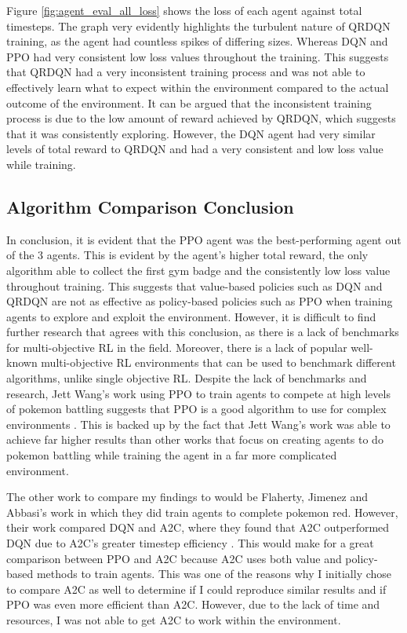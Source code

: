Figure \ref{fig:agent_eval_all_loss} shows the loss of each agent against total timesteps. The graph very evidently highlights the turbulent nature of QRDQN training, as the agent had countless spikes of differing sizes. Whereas DQN and PPO had very consistent low loss values throughout the training. This suggests that QRDQN had a very inconsistent training process and was not able to effectively learn what to expect within the environment compared to the actual outcome of the environment. It can be argued that the inconsistent training process is due to the low amount of reward achieved by QRDQN, which suggests that it was consistently exploring. However, the DQN agent had very similar levels of total reward to QRDQN and had a very consistent and low loss value while training. 

\subsection{Algorithm Comparison Conclusion}

In conclusion, it is evident that the PPO agent was the best-performing agent out of the 3 agents. This is evident by the agent's higher total reward, the only algorithm able to collect the first gym badge and the consistently low loss value throughout training. This suggests that value-based policies such as DQN and QRDQN are not as effective as policy-based policies such as PPO when training agents to explore and exploit the environment. However, it is difficult to find further research that agrees with this conclusion, as there is a lack of benchmarks for multi-objective RL in the field. Moreover, there is a lack of popular well-known multi-objective RL environments that can be used to benchmark different algorithms, unlike single objective RL. Despite the lack of benchmarks and research, Jett Wang's work using PPO to train agents to compete at high levels of pokemon battling suggests that PPO is a good algorithm to use for complex environments \cite{wang2020winning}. This is backed up by the fact that Jett Wang's work was able to achieve far higher results than other works that focus on creating agents to do pokemon battling while training the agent in a far more complicated environment. 

The other work to compare my findings to would be Flaherty, Jimenez and Abbasi's work in which they did train agents to complete pokemon red. However, their work compared DQN and A2C, where they found that A2C outperformed DQN due to A2C's greater timestep efficiency \cite{flaherty2021playing}. This would make for a great comparison between PPO and A2C because A2C uses both value and policy-based methods to train agents. This was one of the reasons why I initially chose to compare A2C as well to determine if I could reproduce similar results and if PPO was even more efficient than A2C. However, due to the lack of time and resources, I was not able to get A2C to work within the environment. 

